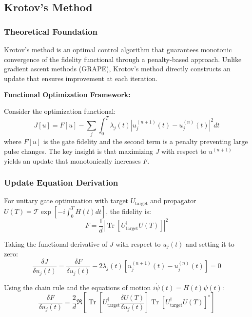 \documentclass[11pt,a4paper]{article}
\theoremstyle{definition}
\theoremstyle{remark}
\renewcommand{\Tr}{\operatorname{Tr}}
\begin{document}
\subsection{Krotov's Method}

\subsubsection{Theoretical Foundation}

Krotov's method is an optimal control algorithm that guarantees monotonic convergence of the fidelity functional through a penalty-based approach. Unlike gradient ascent methods (GRAPE), Krotov's method directly constructs an update that ensures improvement at each iteration.

\textbf{Functional Optimization Framework:}

Consider the optimization functional:
\begin{equation}
J[u] = F[u] - \sum_j \int_0^T \lambda_j(t) \left|u_j^{(n+1)}(t) - u_j^{(n)}(t)\right|^2 dt
\end{equation}
where $F[u]$ is the gate fidelity and the second term is a penalty preventing large pulse changes. The key insight is that maximizing $J$ with respect to $u^{(n+1)}$ yields an update that monotonically increases $F$.

\subsubsection{Update Equation Derivation}

For unitary gate optimization with target $U_{\text{target}}$ and propagator $U(T) = \mathcal{T}\exp\left[-i\int_0^T H(t)dt\right]$, the fidelity is:
\begin{equation}
F = \frac{1}{d}\left|\Tr\left[U_{\text{target}}^\dagger U(T)\right]\right|^2
\end{equation}

Taking the functional derivative of $J$ with respect to $u_j(t)$ and setting it to zero:
\begin{equation}
\frac{\delta J}{\delta u_j(t)} = \frac{\delta F}{\delta u_j(t)} - 2\lambda_j(t)\left[u_j^{(n+1)}(t) - u_j^{(n)}(t)\right] = 0
\end{equation}

Using the chain rule and the equations of motion $i\dot{\psi}(t) = H(t)\psi(t)$:
\begin{equation}
\frac{\delta F}{\delta u_j(t)} = \frac{2}{d}\Re\left[\Tr\left[U_{\text{target}}^\dagger \frac{\delta U(T)}{\delta u_j(t)}\right]\Tr\left[U_{\text{target}}^\dagger U(T)\right]^*\right]
\end{equation}
\end{document}
